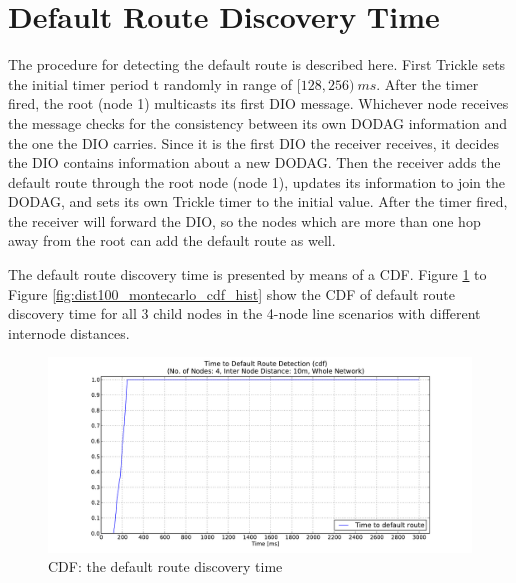 
\section{Default Route Discovery Time}
\label{default route}

The procedure for detecting the default route is described here. First Trickle sets the initial timer period t randomly in range of $[128,256)\:ms$\@. After the timer fired, the root (node 1) multicasts its first DIO message. Whichever node receives the message checks for the consistency between its own DODAG information and the one the DIO carries. Since it is the first DIO the receiver receives, it decides the DIO contains information about a new DODAG. Then the receiver adds the default route through the root node (node 1)\@, updates its information to join the DODAG, and sets its own Trickle timer to the initial value. After the timer fired, the receiver will forward the DIO, so the nodes which are more than one hop away from the root can add the default route as well.
\newline

The default route discovery time is presented by means of a CDF. Figure \ref{fig:dist10_montecarlo_cdf_hist} to Figure \ref{fig:dist100_montecarlo_cdf_hist} show the CDF of default route discovery time for all 3 child nodes in the 4-node line scenarios with different internode distances.

\begin{figure}[htbp]
  \begin{center}
    \leavevmode
      \includegraphics[width=\textwidth]
      {Pics/results/4/MRHOF/line/dist10_montecarlo_cdf_hist.pdf}
   \caption{CDF: the default route discovery time}
    \label{fig:dist10_montecarlo_cdf_hist}
  \end{center}
\end{figure}

